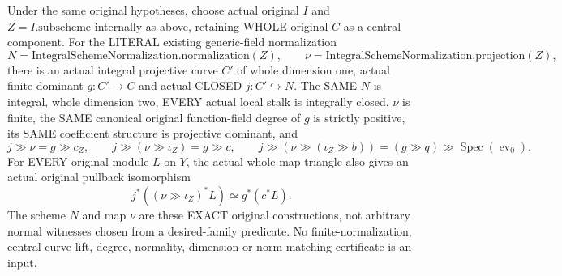 \begin{theorem}
\label{thm:pl-gauss-original-closed-surface-literal-normalization}
\leanok
Under the same original hypotheses, choose actual original $I$ and
$Z=I.\mathrm{subscheme}$ internally as above, retaining WHOLE original
$C$ as a central component. For the LITERAL existing generic-field
normalization
\[
 N=\mathrm{IntegralSchemeNormalization.normalization}(Z),\qquad
 \nu=\mathrm{IntegralSchemeNormalization.projection}(Z),
\]
there is an actual integral projective curve $C'$ of whole dimension
one, actual finite dominant $g:C'\to C$ and actual CLOSED
$j:C'\hookrightarrow N$. The SAME $N$ is integral, whole dimension two,
EVERY actual local stalk is integrally closed, $\nu$ is finite, the SAME
canonical original function-field degree of $g$ is strictly positive, its
SAME coefficient structure is projective dominant, and
\[
 j\gg\nu=g\gg c_Z,\qquad
 j\gg(\nu\gg\iota_Z)=g\gg c,\qquad
 j\gg(\nu\gg(\iota_Z\gg b))
   =(g\gg q)\gg\operatorname{Spec}(\operatorname{ev}_0).
\]
For EVERY original module $L$ on $Y$, the actual whole-map triangle
also gives an actual original pullback isomorphism
\[
 j^*((\nu\gg\iota_Z)^*L)\simeq g^*(c^*L).
\]
The scheme $N$ and map $\nu$ are these EXACT original constructions,
not arbitrary normal witnesses chosen from a desired-family predicate.
No finite-normalization, central-curve lift, degree, normality, dimension
or norm-matching certificate is an input.
\end{theorem}
